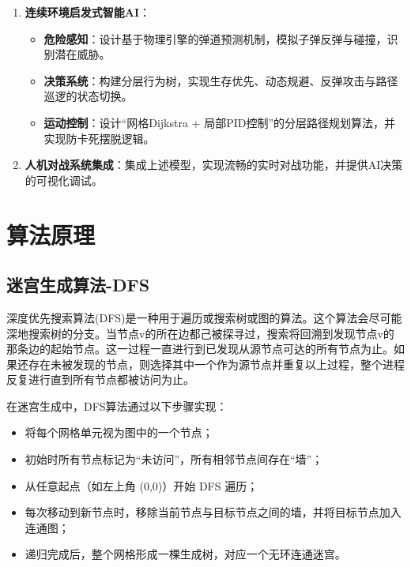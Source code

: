 \documentclass[conference]{IEEEtran}
\begin{document}
\begin{enumerate}
    \item \textbf{连续环境启发式智能AI}：
    \begin{itemize}
        \item \textbf{危险感知}：设计基于物理引擎的弹道预测机制，模拟子弹反弹与碰撞，识别潜在威胁。
        \item \textbf{决策系统}：构建分层行为树，实现生存优先、动态规避、反弹攻击与路径巡逻的状态切换。
        \item \textbf{运动控制}：设计“网格Dijkstra + 局部PID控制”的分层路径规划算法，并实现防卡死摆脱逻辑。
    \end{itemize}
    
    \item \textbf{人机对战系统集成}：集成上述模型，实现流畅的实时对战功能，并提供AI决策的可视化调试。
\end{enumerate}

\section{算法原理}

\subsection{迷宫生成算法-DFS}
深度优先搜索算法(DFS)是一种用于遍历或搜索树或图的算法。这个算法会尽可能深地搜索树的分支。当节点v的所在边都己被探寻过，搜索将回溯到发现节点v的那条边的起始节点。这一过程一直进行到已发现从源节点可达的所有节点为止。如果还存在未被发现的节点，则选择其中一个作为源节点并重复以上过程，整个进程反复进行直到所有节点都被访问为止。\par
在迷宫生成中，DFS算法通过以下步骤实现：
\begin{itemize}
\item 将每个网格单元视为图中的一个节点；
\item 初始时所有节点标记为“未访问”，所有相邻节点间存在“墙”；
\item 从任意起点（如左上角 (0,0)）开始 DFS 遍历；
\item 每次移动到新节点时，移除当前节点与目标节点之间的墙，并将目标节点加入连通图；
\item 递归完成后，整个网格形成一棵生成树，对应一个无环连通迷宫。
\end{itemize}
\end{document}
